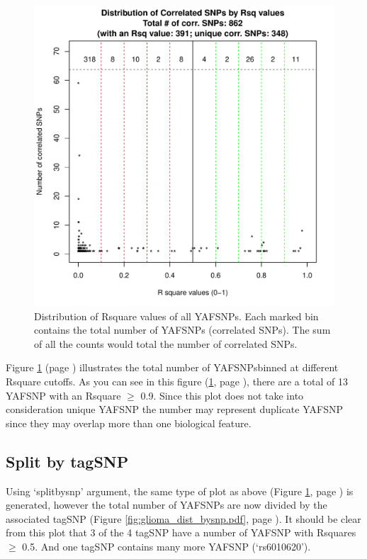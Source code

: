 \documentclass[12pt,fullpage]{article}
\begin{document}
\begin{figure}[ht!]
\begin{center}
\includegraphics{glioma_dist.pdf}
\caption{\label{fig:glioma_dist.pdf} Distribution of Rsquare values of all 
YAFSNPs. Each marked bin contains the total number of YAFSNPs
(correlated SNPs). The sum of all the counts would total the number of
correlated SNPs.}
{\footnotesize{}}
\end{center}
\end{figure}

Figure \ref{fig:glioma_dist.pdf} (page \pageref{fig:glioma_dist.pdf})
illustrates the total number of YAFSNPsbinned at different Rsquare cutoffs.
As you can see in this figure (\ref{fig:glioma_dist.pdf}, page
        \pageref{fig:glioma_dist.pdf}), there are a total of 13 YAFSNP with
an Rsquare $\ge$ 0.9. Since this plot does not take into consideration unique
YAFSNP the number may represent duplicate YAFSNP since they may overlap
more than one biological feature.

\subsection{Split by tagSNP}

Using `splitbysnp' argument, the same type of plot as above (Figure
\ref{fig:glioma_dist.pdf}, page \pageref{fig:glioma_dist.pdf}) is generated,
      however the total number of YAFSNPs are now divided by the associated
      tagSNP (Figure \ref{fig:glioma_dist_bysnp.pdf}, page
              \pageref{fig:glioma_dist_bysnp.pdf}). It should be clear from this
      plot that 3 of the 4 tagSNP have a number of YAFSNP with Rsquares
      $\ge$ 0.5.  And one tagSNP contains many more YAFSNP (`rs6010620').
\end{document}
